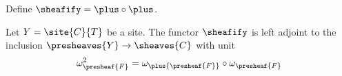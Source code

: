 \begin{definition}
Define $\sheafify = \plus \circ \plus$.
\end{definition}

\begin{lemma}
Let $Y=\site{C}{T}$ be a site.
The functor $\sheafify$ is left adjoint to the inclusion $\presheaves{Y} \rightarrow \sheaves{C}$
with unit 
\[\omega^2_{\presheaf{F}} = \omega_{\plus{\presheaf{F}}} \circ \omega_{\presheaf{F}}\]
\end{lemma}